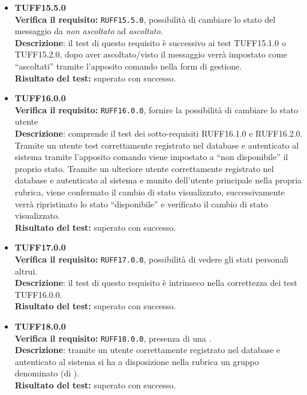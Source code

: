 \begin{itemize}
\item \textbf{TUFF15.5.0}\\
\textbf{Verifica il requisito:} \texttt{RUFF15.5.0}, possibilità di cambiare lo stato del messaggio da \textit{non ascoltato} ad \textit{ascoltato}.\\
\textbf{Descrizione}: il test di questo requisito è successivo ai test TUFF15.1.0 o TUFF15.2.0, dopo aver ascoltato/visto il messaggio verrà impostato come ``ascoltati'' tramite l'apposito comando nella form di gestione.\\
\textbf{Risultato del test:} superato con successo.

\item \textbf{TUFF16.0.0}\\
\textbf{Verifica il requisito:} \texttt{RUFF16.0.0}, fornire la possibilità di cambiare lo stato utente\\
\textbf{Descrizione}: comprende il test dei sotto-requisiti RUFF16.1.0 e RUFF16.2.0. Tramite un utente test correttamente registrato nel database e autenticato al sistema tramite l'apposito comando viene impostato a ``non disponibile'' il proprio stato. Tramite un ulteriore utente  correttamente registrato nel database e autenticato al sistema e munito dell'utente  principale nella propria rubrica, viene confermato il cambio di stato visualizzato, successivamente verrà ripristinato lo stato ``disponibile'' e verificato il cambio di stato visualizzato.\\
\textbf{Risultato del test:} superato con successo.

\item \textbf{TUFF17.0.0}\\
\textbf{Verifica il requisito:} \texttt{RUFF17.0.0}, possibilità di vedere gli stati personali altrui.\\
\textbf{Descrizione}: il test di questo requisito è intrinseco nella correttezza dei test TUFF16.0.0.\\
\textbf{Risultato del test:} superato con successo.

\item \textbf{TUFF18.0.0}\\ %
\textbf{Verifica il requisito:} \texttt{RUFF18.0.0}, presenza di una .\\
\textbf{Descrizione}: tramite un utente  correttamente registrato nel database e autenticato al sistema si ha a disposizione nella rubrica un gruppo denominato  (di ).\\
\textbf{Risultato del test:} superato con successo.


\end{itemize}
